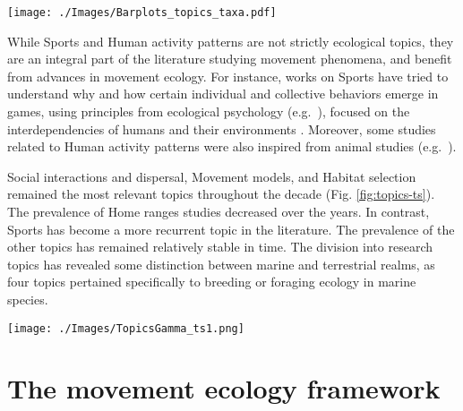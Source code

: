 \documentclass[a4paper,12pt]{article}
\begin{document}
\begin{figure*}
	\texttt{[image: ./Images/Barplots\_topics\_taxa.pdf]}
	\caption{For each topic, relative frequencies of papers studying each
		taxonomical group. Only papers with more than $50\%$ of association to each topic ($\gamma$, see Materials and Methods) are used for this graph.}
	\label{fig:topics-taxa}
\end{figure*}

While Sports and Human activity patterns are not strictly ecological
topics, they are an integral part of the literature studying movement
phenomena, and benefit from advances in movement ecology. For instance,
works on Sports have tried to understand why and how certain individual
and collective behaviors emerge in games, using principles from
ecological psychology (e.g.~\cite{Travassos2013}), focused on the interdependencies of
humans and their environments \cite{Barker1968}. Moreover, some studies related to
Human activity patterns were also inspired from animal studies
(e.g.~\cite{Wasenius2017}).

Social interactions and dispersal, Movement models, and Habitat
selection remained the most relevant topics throughout the decade (Fig.
\ref{fig:topics-ts}). The prevalence of Home ranges studies decreased
over the years. In contrast, Sports has become a more recurrent topic in
the literature. The prevalence of the other topics has remained
relatively stable in time. The division into research topics has
revealed some distinction between marine and terrestrial realms, as four
topics pertained specifically to breeding or foraging ecology in marine
species.

\begin{figure*}
	\texttt{[image: ./Images/TopicsGamma\_ts1.png]}
	\caption{Time series of the relative prevalence of each topic every
		year. To improve readability, the topics with the most pronounced increases and decreases have been highlighted by continuous and dashed lines, respectively.}
	\label{fig:topics-ts}
\end{figure*}


\section*{The movement ecology framework}
\end{document}
